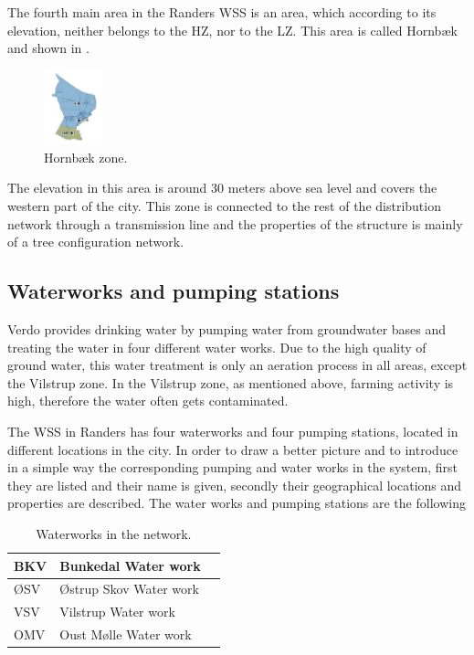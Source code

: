 \vspace{-3mm}

The fourth main area in the Randers WSS is an area, which according to its elevation, neither belongs to the HZ, nor to the LZ. This area is called Hornbæk and shown in .

\begin{figure}[H]
\centering
\includegraphics[width=0.15\textwidth]{report/pictures/Hornbaek_region}
\caption{Hornbæk zone.}
\label{fig:hornbaek_region}
\end{figure}

\vspace{-3mm}

The elevation in this area is around 30 meters above sea level and covers the western part of the city. This zone is connected to the rest of the distribution network through a transmission line and the properties of the structure is mainly of a tree configuration network. 

\subsection{Waterworks and pumping stations}
\label{waterworks_and_pumping_stations}

Verdo provides drinking water by pumping water from groundwater bases and treating the water in four different water works. Due to the high quality of ground water, this water treatment is only an aeration process in all areas, except the Vilstrup zone. In the Vilstrup zone, as mentioned above, farming activity is high, therefore the water often gets contaminated. 

The WSS in Randers has four waterworks and four pumping stations, located in different locations in the city. In order to draw a better picture and to introduce in a simple way the corresponding pumping and water works in the system, first they are listed and their name is given, secondly their geographical locations and properties are described. The water works and pumping stations are the following

\begin{table}[H]
\begin{center}
    \begin{tabular}{| l | l | l |}
    \hline
    BKV & Bunkedal Water work   \\ \hline
    ØSV & Østrup Skov Water work  \\ \hline
    VSV & Vilstrup Water work  \\ \hline
    OMV & Oust Mølle Water work   \\
    \hline
    \end{tabular}
\end{center}
\vspace{-3mm}
\caption{Waterworks in the network.}
\end{table}

